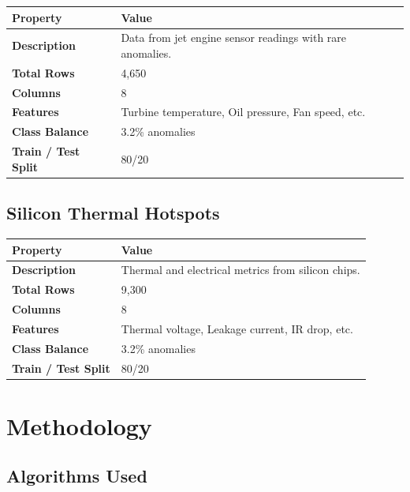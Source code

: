 \documentclass[11pt,a4paper]{article}
\begin{document}
\begin{tabularx}{\linewidth}{@{}>{\bfseries}l X @{}}
  \arrayrulecolor{tableheader}
  \toprule
  \rowcolor{tableheader} Property & Value \\
  \midrule
  \rowcolor{white} Description & Data from jet engine sensor readings with rare anomalies. \\
  \rowcolor{tablerow} Total Rows & 4,650 \\
  \rowcolor{white} Columns & 8 \\
  \rowcolor{tablerow} Features & Turbine temperature, Oil pressure, Fan speed, etc. \\
  \rowcolor{white} Class Balance & 3.2\% anomalies \\
  \rowcolor{tablerow} Train / Test Split & 80/20 \\
  \bottomrule
\end{tabularx}

\vspace{6pt}

\subsection{Silicon Thermal Hotspots}

\begin{tabularx}{\linewidth}{@{}>{\bfseries}l X @{}}
  \arrayrulecolor{tableheader}
  \toprule
  \rowcolor{tableheader} Property & Value \\
  \midrule
  \rowcolor{white} Description & Thermal and electrical metrics from silicon chips. \\
  \rowcolor{tablerow} Total Rows & 9,300 \\
  \rowcolor{white} Columns & 8 \\
  \rowcolor{tablerow} Features & Thermal voltage, Leakage current, IR drop, etc. \\
  \rowcolor{white} Class Balance & 3.2\% anomalies \\
  \rowcolor{tablerow} Train / Test Split & 80/20 \\
  \bottomrule
\end{tabularx}

\section{Methodology}

\subsection{Algorithms Used}
\end{document}

